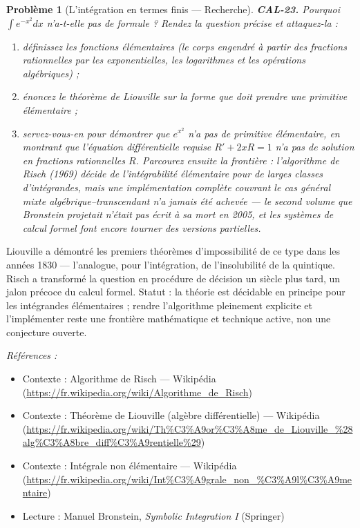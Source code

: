 \documentclass[11pt]{article}
\newtheorem{problem}{Problème}
\newenvironment{refs}{\par\small\noindent\emph{Références :}\begin{itemize}\setlength\itemsep{0pt}}{\end{itemize}\normalsize}
\begin{document}
\begin{problem}[{L'intégration en termes finis --- Recherche}]
\textbf{CAL-23.} Pourquoi $ \int e^{-x^2}dx $ n'a-t-elle pas de formule ? Rendez
la question précise et attaquez-la :
\begin{enumerate}
\item[(i)] définissez les fonctions élémentaires (le corps
engendré à partir des fractions rationnelles par les exponentielles, les logarithmes et les opérations algébriques) ;
\item[(ii)] énoncez le théorème de Liouville sur la forme que doit prendre une primitive élémentaire ;
\item[(iii)] servez-vous-en pour démontrer que $ e^{x^2} $ n'a pas de primitive élémentaire, en montrant que
l'équation différentielle requise $ R' + 2xR = 1 $ n'a pas de solution en fractions rationnelles
$ R $. Parcourez ensuite la frontière : l'algorithme de Risch (1969) décide de
l'intégrabilité élémentaire pour de larges classes d'intégrandes, mais une implémentation complète couvrant le
cas général mixte algébrique--transcendant n'a jamais été achevée --- le second volume que
Bronstein projetait n'était pas écrit à sa mort en 2005, et les systèmes de calcul formel
font encore tourner des versions partielles.
\end{enumerate}

\end{problem}

\noindent Liouville a démontré les premiers théorèmes d'impossibilité de ce type dans les années 1830 ---
l'analogue, pour l'intégration, de l'insolubilité de la quintique. Risch a transformé la question
en procédure de décision un siècle plus tard, un jalon précoce du calcul formel. Statut :
la théorie est décidable en principe pour les intégrandes élémentaires ; rendre l'algorithme pleinement
explicite et l'implémenter reste une frontière mathématique et technique active, non une
conjecture ouverte.

\begin{refs}
\item Contexte : Algorithme de Risch --- Wikipédia (\url{https://fr.wikipedia.org/wiki/Algorithme_de_Risch})
\item Contexte : Théorème de Liouville (algèbre différentielle) --- Wikipédia (\url{https://fr.wikipedia.org/wiki/Th%C3%A9or%C3%A8me_de_Liouville_%28alg%C3%A8bre_diff%C3%A9rentielle%29})
\item Contexte : Intégrale non élémentaire --- Wikipédia (\url{https://fr.wikipedia.org/wiki/Int%C3%A9grale_non_%C3%A9l%C3%A9mentaire})
\item Lecture : Manuel Bronstein, \textit{Symbolic Integration I} (Springer)
\end{refs}
\end{document}
